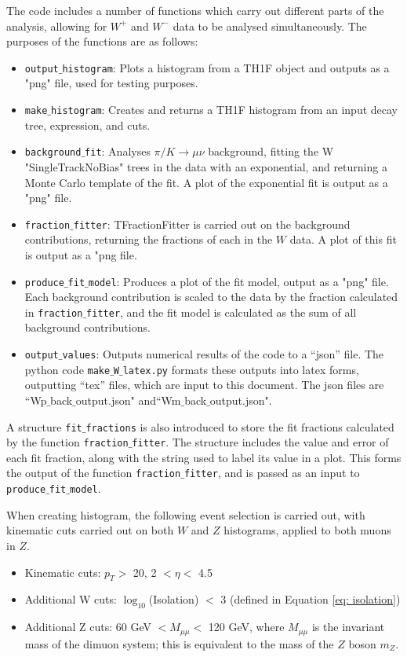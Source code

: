 \documentclass[a4paper]{article}
\begin{document}
The code includes a number of functions which carry out different parts of the analysis, allowing for $W^+$ and $W^-$ data to be analysed simultaneously. The purposes of the functions are as follows:
\begin{itemize}
    \item \texttt{output$\_$histogram}: Plots a histogram from a TH1F object and outputs as a "png" file, used for testing purposes.
    \item \texttt{make$\_$histogram}: Creates and returns a TH1F histogram from an input decay tree, expression, and cuts.
    \item \texttt{background$\_$fit}: Analyses $\pi/K \xrightarrow{} \mu\nu$ background, fitting the W "SingleTrackNoBias" trees in the data with an exponential, and returning a Monte Carlo template of the fit. A plot of the exponential fit is output as a "png" file.
    \item \texttt{fraction$\_$fitter}: TFractionFitter is carried out on the background contributions, returning the fractions of each in the $W$ data. A plot of this fit is output as a "png file. 
    \item \texttt{produce$\_$fit$\_$model}: Produces a plot of the fit model, output as a "png" file. Each background contribution is scaled to the data by the fraction calculated in \texttt{fraction$\_$fitter}, and the fit model is calculated as the sum of all background contributions.
    \item \texttt{output$\_$values}: Outputs numerical results of the code to a ``json'' file. The python code \texttt{make$\_$W$\_$latex.py} formats these outputs into latex forms, outputting ``tex'' files, which are input to this document. The json files are ``Wp$\_$back$\_$output.json" and``Wm$\_$back$\_$output.json".
\end{itemize}
A structure \texttt{fit$\_$fractions} is also introduced to store the fit fractions calculated by the function \texttt{fraction$\_$fitter}. The structure includes the value and error of each fit fraction, along with the string used to label its value in a plot. This forms the output of the function \texttt{fraction$\_$fitter}, and is passed as an input to \texttt{produce$\_$fit$\_$model}.

When creating histogram, the following event selection is carried out, with kinematic cuts carried out on both $W$ and $Z$ histograms, applied to both muons in $Z$.
\begin{itemize}
    \item Kinematic cuts: $p_T >$ 20, 2 $< \eta <$ 4.5
    \item Additional W cuts: $\log_{10}$(Isolation) $<$ 3 (defined in Equation \ref{eq: isolation})
    \item Additional Z cuts: 60 GeV $< M_{\mu\mu} <$ 120 GeV, where $M_{\mu\mu}$ is the invariant mass of the dimuon system; this is equivalent to the mass of the $Z$ boson $m_Z$.
\end{itemize}
\end{document}

